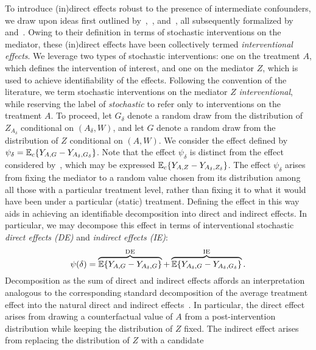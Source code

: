To introduce (in)direct effects robust to the presence of intermediate
confounders, we draw upon ideas first outlined
by~\cite{didelez2006direct},~\cite{petersen2006estimation},
and~\cite{vdl2008direct}, all subsequently formalized
by~\cite{vanderweele2014effect} and~\cite{vansteelandt2017interventional}. Owing
to their definition in terms of stochastic interventions on the mediator, these
(in)direct effects have been collectively termed \emph{interventional effects}.
We leverage two types of stochastic interventions: one on the treatment $A$,
which defines the intervention of interest, and one on the mediator $Z$, which
is used to achieve identifiability of the effects. Following the convention of
the literature, we term stochastic interventions on the mediator $Z$
\textit{interventional}, while reserving the label of \textit{stochastic} to
refer only to interventions on the treatment $A$. To proceed, let $G_\delta$
denote a random draw from the distribution of $Z_{A_\delta}$ conditional on
$(A_\delta, W)$, and let $G$ denote a random draw from the distribution of $Z$
conditional on $(A, W)$. We consider the effect defined by $\psi_\delta
= \mathbb{E}_c\{Y_{A,G} - Y_{A_\delta,G_\delta}\}$. Note that the effect $\psi_{\delta}$
is distinct from the effect considered by~\cite{diaz2020causal}, which may be
expressed $\mathbb{E}_c\{Y_{A,Z} - Y_{A_\delta,Z_\delta}\}$. The effect $\psi_\delta$
arises from fixing the mediator to a random value chosen from its distribution
among all those with a particular treatment level, rather than fixing it to what
it would have been under a particular (static) treatment. Defining the effect in
this way aids in achieving an identifiable decomposition into direct and
indirect effects. In particular, we may decompose this effect in terms of
interventional stochastic \textit{direct effects (DE)} and \textit{indirect
effects (IE)}:
\begin{equation}\label{eqn:pie_decomp}
  \psi(\delta) = \overbrace{\mathbb{E}\{Y_{A, G} -
    Y_{A_\delta, G}\}}^{\text{DE}} +
  \overbrace{\mathbb{E}\{Y_{A_\delta, G} -
    Y_{A_\delta, G_\delta}\}}^{\text{IE}}.
\end{equation}
Decomposition as the sum of direct and indirect effects affords an
interpretation analogous to the corresponding standard decomposition of the
average treatment effect into the natural direct and indirect
effects~\citep{pearl2001direct}. In particular, the direct effect arises
from drawing a counterfactual value of $A$ from a post-intervention
distribution while keeping the distribution of $Z$ fixed. The indirect
effect arises from replacing the distribution of $Z$ with a candidate
